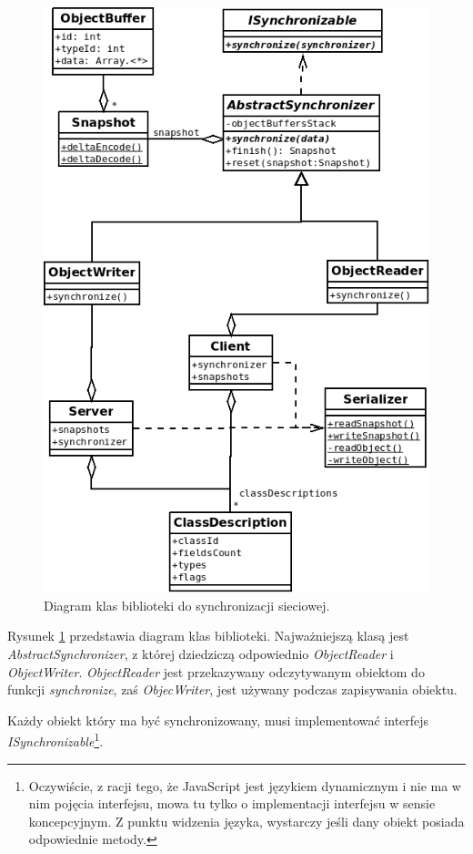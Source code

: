 \begin{figure}[h!]
  \centering
  \includegraphics[scale=0.7]{zasoby/rozdzial31/network}  
  \caption{Diagram klas biblioteki do synchronizacji sieciowej.}
  \label{fig:networkSync}
\end{figure}

Rysunek \ref{fig:networkSync} przedstawia diagram klas biblioteki.
Najważniejszą klasą jest \emph{AbstractSynchronizer}, z której dziedziczą odpowiednio \emph{ObjectReader}
i \emph{ObjectWriter}. \emph{ObjectReader} jest przekazywany odczytywanym obiektom do funkcji \emph{synchronize},
zaś \emph{ObjecWriter}, jest używany podczas zapisywania obiektu.

Każdy obiekt który ma być synchronizowany, musi implementować interfejs \emph{ISynchronizable}\footnote{
  Oczywiście, z racji tego, że JavaScript jest językiem dynamicznym i nie ma w nim pojęcia interfejsu,
  mowa tu tylko o implementacji interfejsu w sensie koncepcyjnym. Z punktu widzenia języka, wystarczy
  jeśli dany obiekt posiada odpowiednie metody.}.

